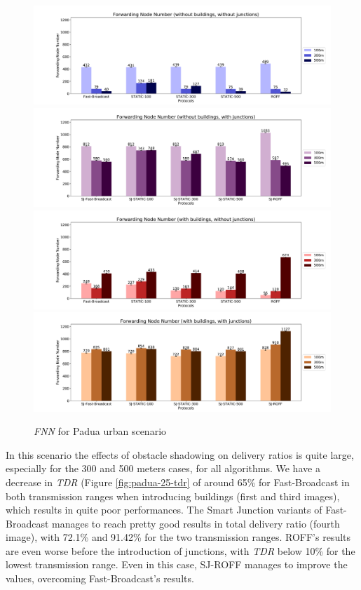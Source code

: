 		\begin{figure}[H]
			\centering
			\includegraphics[width=1.0\textwidth]{immagini/padua-25/b0/j0/fnn}
			\includegraphics[width=1.0\textwidth]{immagini/padua-25/b0/j1/fnn}
			\includegraphics[width=1.0\textwidth]{immagini/padua-25/b1/j0/fnn}
			\includegraphics[width=1.0\textwidth]{immagini/padua-25/b1/j1/fnn}
			\caption{\textit{FNN} for Padua urban scenario}
			\label{fig:padua-25-fnn}
		\end{figure}
	
		In this scenario the effects of obstacle shadowing on delivery ratios is quite large, especially for the 300 and 500 meters cases, for all algorithms. We have a decrease in \textit{TDR} (Figure \ref{fig:padua-25-tdr} of around 65\% for Fast-Broadcast in both transmission ranges when introducing buildings (first and third images), which results in quite poor performances. The Smart Junction variants of Fast-Broadcast manages to reach pretty good results in total delivery ratio (fourth image), with 72.1\% and 91.42\% for the two transmission ranges. ROFF's results are even worse before the introduction of junctions, with \textit{TDR} below 10\% for the lowest transmission range. Even in this case, SJ-ROFF manages to improve the values, overcoming Fast-Broadcast's results.
		
